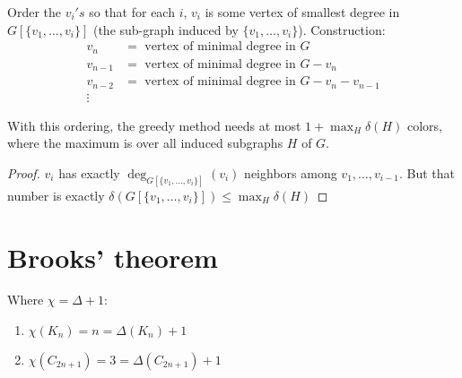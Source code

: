\begin{example}
Order the $v_i's$ so that for each $i$, $v_i$ is some vertex of smallest
degree in $G[\{v_1,\ldots,v_i\}]$ (the sub-graph induced by
$\{v_1,\ldots,v_i\}$).
Construction:
\begin{align*}
v_n &= \text{ vertex of minimal degree in } G \\
v_{n-1} &= \text{ vertex of minimal degree in } G-v_n \\
v_{n-2} &= \text{ vertex of minimal degree in } G-v_n-v_{n-1} \\
\vdots & 
\end{align*}
\end{example}

\begin{theorem}
With this ordering, the greedy method needs at most $1 + \max_H \delta(H)$ colors, 
where the maximum is over all induced subgraphs $H$ of $G$.
\end{theorem}
\begin{proof}
$v_i$ has exactly $\deg_{G[\{v_1,\ldots,v_i\}]}(v_i)$ neighbors among
$v_1,\ldots,v_{i-1}$. But that number is exactly
$\delta(G[\{v_1,\ldots,v_i\}]) \le \max_H \delta(H)$
\end{proof}


\section{Brooks' theorem}

\begin{example}
Where $\chi = \Delta + 1$:
\begin{enumerate}[(1)]
\item $\chi(K_n) = n = \Delta(K_n) + 1$
\item $\chi(C_{2n + 1}) = 3 = \Delta(C_{2n+1}) + 1$
\end{enumerate}
\end{example}

